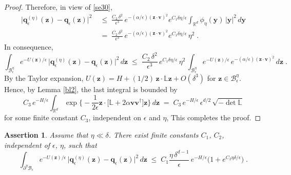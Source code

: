 \documentclass[reqno]{amsart}
\newcounter{as}[section]
\newtheorem{asser}[as]{Assertion}
\newcommand{\mc}[1]{{\mathcal #1}}
\newcommand{\bb}[1]{{\mathbb #1}}
\newcommand{\bs}[1]{{\boldsymbol #1}}
\newcommand{\<}{\langle}
\renewcommand{\>}{\rangle}
\begin{document}
\begin{proof}
Therefore, in view of \eqref{se30},
\begin{align*}
\big|\bs{q}_{\epsilon}^{(\eta)}(\bs{z})
-\bs{q}_{\epsilon}(\bs{z})\big|^{2}
\; &\le\; \frac{C_2 \, \delta^{2}}{\epsilon^{3}}\,
e^{-(\alpha/\epsilon)(\bs{z}\cdot\bs{v})^{2}}
e^{C_1\delta\eta/\epsilon}
\int_{\bb{R}^{d}}\phi_{\eta}(\bs{y})\, |\bs{y}|^{2}\, d\bs{y}\\
\;&=\; \frac{C_2 \, \delta^{2}}{\epsilon^{3}}\,
e^{-(\alpha/\epsilon)(\bs{z}\cdot\bs{v})^{2}}
e^{C_1\delta\eta/\epsilon} \, \eta^{2}\;.
\end{align*}
In consequence,
\begin{equation*}
\int_{\mc{B}_{\epsilon}^{\eta}} e^{-U(\bs{z})/\epsilon}\,
\big|\bs{q}_{\epsilon}^{(\eta)}(\bs{z})
-\bs{q}_{\epsilon}(\bs{z})\big|^{2}\, d\bs{z}
\;\le\; \frac{C_2 \, \delta^{2}}{\epsilon^{3}}\,
e^{C_1\delta\eta/\epsilon} \, \eta^{2} \,
\int_{\mc{B}_{\epsilon}^{\eta}} e^{-U(\bs{z})/\epsilon}\,
e^{-(\alpha/\epsilon)(\bs{z}\cdot\bs{v})^{2}} \, d\bs{z}\;.
\end{equation*}
By the Taylor expansion, $U(\bs{z})=H+(1/2)\, \bs{z} \cdot \bb{L}
\bs{z} +O(\delta^{3})$ for $\bs{z}\in\mc{B}_{\epsilon}^{\eta}$. Hence,
by Lemma \ref{bl2}, the last integral is bounded by
\begin{equation*}
C_3 \, e^{-H/\epsilon} \int_{\bb{R}^{d}}
\exp\Big\{ -\frac{1}{2\epsilon} \bs{z}\cdot \big[\bb{L} +
2\alpha\bs{v}\bs {v}^{\dagger}\big]\bs{z}\Big\} \, d\bs{z}
\;=\;C_3\,  e^{-H/\epsilon} \, \epsilon^{d/2}\, \sqrt{-\det\bb{L}}
\end{equation*}
for some finite constant $C_3$, independent on $\epsilon$ and $\eta$,
This completes the proof.
\end{proof}

\begin{asser}
\label{as02}
Assume that $\eta\ll \delta$.  There exist finite constants $C_{1}$,
$C_{2}$, independent of $\epsilon$, $\eta$, such that
\begin{equation*}
\int_{\partial^{\eta}\mc{B}_{\epsilon}}
e^{-U(\bs{z})/\epsilon} \, \big|\bs{q}_{\epsilon}^{(\eta)}(\bs{z})
-\bs{q}_{\epsilon}(\bs{z})\big|^{2} \, d\bs{z}\;\le\;
C_{1}\frac{\eta\, \delta^{d-1}}{\epsilon}\,
e^{-H/\epsilon} \Big(1+e^{C_{2}\eta\delta/\epsilon}\Big)\;.
\end{equation*}
\end{asser}
\end{document}
